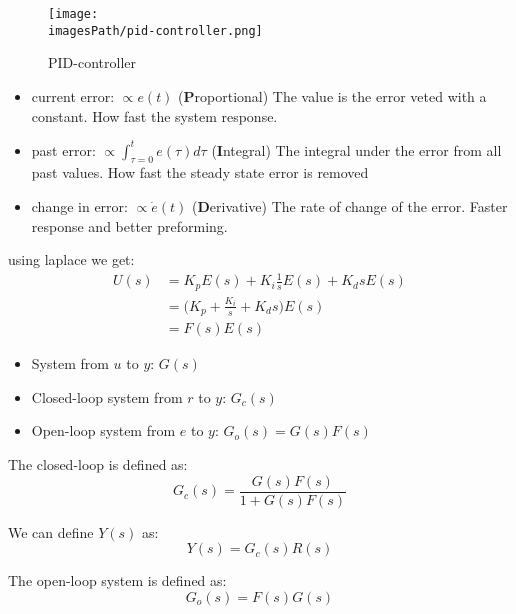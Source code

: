 \begin{figure}[!h]
    \centering
    \texttt{[image: \\imagesPath/pid-controller.png]}
    \caption{PID-controller}
    \label{fig:pid-controller}
\end{figure}

\begin{itemize}
    \item current error: $\propto e(t)$ (\textbf{P}roportional) \newline 
    The value is the error veted with a constant. How fast the system response.
    \item past error: $\propto \int_{\tau=0}^t e(\tau)d\tau$ (\textbf{I}ntegral) \newline
    The integral under the error from all past values. How fast the steady state error is removed
    \item change in error: $\propto \dot{e}(t)$ (\textbf{D}erivative) \newline
    The rate of change of the error. Faster response and better preforming.
\end{itemize}

using laplace we get:
\begin{align*}
    U(s) &= K_p E(s) + K_i\frac{1}{s}E(s) + K_d s E(s) \\
    &= \Big(K_p + \frac{K_i}{s} + K_d s \Big) E(s) \\
    &= F(s)E(s)
\end{align*}

\begin{itemize}
    \item System from $u$ to $y$: $G(s)$
    \item Closed-loop system from $r$ to $y$: $G_c(s)$
    \item Open-loop system from $e$ to $y$: $G_o(s) = G(s)F(s)$
\end{itemize}

The closed-loop is defined as:
\begin{equation*}
    G_c(s) = \frac{G(s)F(s)}{1+G(s)F(s)}
\end{equation*}

We can define $Y(s)$ as:
\begin{equation*}
    Y(s) = G_c(s) R(s)    
\end{equation*}

The open-loop system is defined as:
\begin{equation*}
    G_o(s) = F(s)G(s)
\end{equation*}


